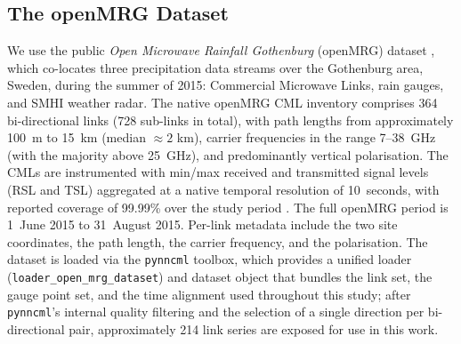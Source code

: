 \documentclass[12pt, a4paper]{article}
\begin{document}
\subsection{The openMRG Dataset}

We use the public \emph{Open Microwave Rainfall Gothenburg} (openMRG)
dataset \cite{andersson2023openmrg}, which co-locates three precipitation
data streams over the Gothenburg area, Sweden, during the summer of
2015: Commercial Microwave Links, rain gauges, and SMHI weather radar.
The native openMRG CML inventory comprises 364 bi-directional links
(728 sub-links in total), with path lengths from approximately 100~m
to 15~km (median \(\approx 2\) km), carrier frequencies in the range
7--38~GHz (with the majority above 25~GHz), and predominantly vertical
polarisation. The CMLs are instrumented with min/max received and
transmitted signal levels (RSL and TSL) aggregated at a native temporal
resolution of 10~seconds, with reported coverage of 99.99\% over the
study period \cite{andersson2023openmrg}. The full openMRG period is
1~June 2015 to 31~August 2015. Per-link metadata include the two site
coordinates, the path length, the carrier frequency, and the
polarisation. The dataset is loaded via the \texttt{pynncml} toolbox,
which provides a unified loader (\texttt{loader\_open\_mrg\_dataset})
and dataset object that bundles the link set, the gauge point set, and
the time alignment used throughout this study; after \texttt{pynncml}'s
internal quality filtering and the selection of a single direction per
bi-directional pair, approximately 214 link series are exposed for
use in this work.
\end{document}
